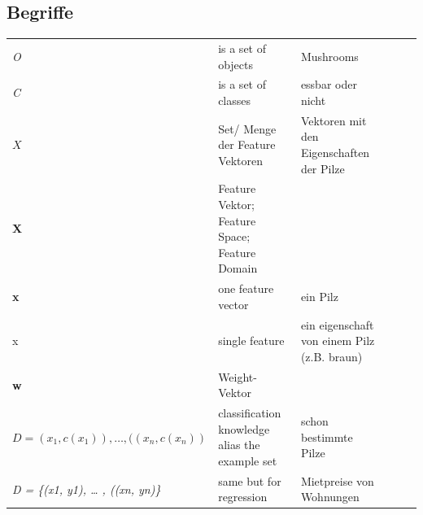 \documentclass[11pt,a4paper]{article}
\author{Bianca}
\begin{document}
\begin{flushleft}
\section{Begriffe}
\begin{table}[]
{
\begin{tabular}{l p{5cm} l p{7cm} l p{7cm}}
\textit{O} & is a set of objects  & Mushrooms \\
\textit{C} & is a set of classes  & essbar oder nicht \\
$X$ & Set/ Menge der Feature Vektoren & Vektoren mit den Eigenschaften der Pilze                 \\
\textbf{X}                                                             & Feature Vektor; Feature Space; Feature Domain                                      &                                                                                                                       \\
\textbf{x}                                                             & one feature vector                                                                 & ein Pilz                                                                                                              \\
x                                                                      & single feature                                                                     & ein eigenschaft von einem Pilz (z.B. braun)                                                                          \\
\textbf{w}                                                             & Weight-Vektor                                                                      &                                                                                                                       \\
$D={(x_1, c(x_1)),…, ((x_n, c(x_n))}$                         & classification knowledge alias the example set                                     & schon bestimmte Pilze                                                                                                 \\
\textit{D = \{(x1, y1), … , ((xn, yn)\}}                               & same but for regression                                                            & Mietpreise von Wohnungen                                                                                             \\

\end{tabular}}
\end{table}
\end{flushleft}
\end{document}
